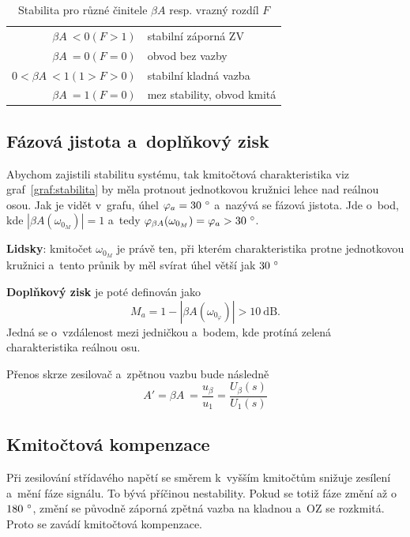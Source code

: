 \documentclass[a4paper,12pt]{article}   %
\begin{document}
\begin{table}[h!]
    \centering
    \begin{tabular}{rl}
        $\beta A~< 0 (F>1)$ & stabilní záporná ZV\\
        $\beta A~= 0 (F=0)$ & obvod bez vazby \\
        $0 < \beta A~< 1(1>F>0)$&stabilní kladná vazba\\
        $\beta A~= 1 (F=0)$ & mez stability, obvod kmitá\\
    \end{tabular}
    \caption{Stabilita pro různé činitele $\beta A$ resp. vrazný rozdíl $F$}
    \label{tab:stabilita}
\end{table}

\subsection*{Fázová jistota a~doplňkový zisk}
Abychom zajistili stabilitu systému, tak kmitočtová charakteristika viz graf~\ref{graf:stabilita} by měla protnout jednotkovou kružnici lehce nad reálnou osou. Jak je vidět v~grafu, úhel $\varphi_a = 30~\degree$ a~nazývá se fázová jistota. Jde o~bod, kde $|\beta A(\omega_{0_M})| = 1$ a~tedy $\varphi_{\beta A}(\omega_{0_M}) = \varphi_a > 30~\degree$.

\textbf{Lidsky}: kmitočet $\omega_{0_M}$ je právě ten, při kterém charakteristika protne jednotkovou kružnici a~tento průnik by měl svírat úhel větší jak $30~\degree$

\textbf{Doplňkový zisk} je poté definován jako
\begin{equation*}
    M_a = 1-|\beta A(\omega_{0_\varphi})| > 10~\text{dB}.
\end{equation*}
Jedná se o~vzdálenost mezi jedničkou a~bodem, kde protíná zelená charakteristika reálnou osu.

Přenos skrze zesilovač a~zpětnou vazbu bude následně
\begin{equation*}
    A' = \beta A~= \frac{u_\beta}{u_\text{1}} = \frac{U_\beta (s)}{U_\text{1}(s)}
\end{equation*}

\subsection*{Kmitočtová kompenzace}
Při zesilování střídavého napětí se směrem k~vyšším kmitočtům snižuje zesílení a~mění fáze signálu. To bývá příčinou nestability. Pokud se totiž fáze změní až o~$180~\degree$, změní se původně záporná zpětná vazba na kladnou a~OZ se rozkmitá. Proto se zavádí kmitočtová kompenzace.
\end{document}

